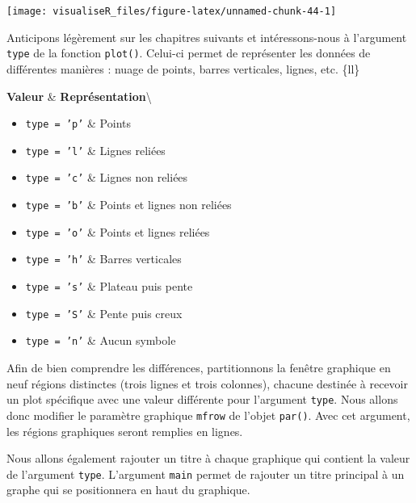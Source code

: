 \documentclass[]{article}
\providecommand{\tightlist}{%
  \setlength{\itemsep}{0pt}\setlength{\parskip}{0pt}}
\begin{document}
\begin{center}\texttt{[image: visualiseR\_files/figure-latex/unnamed-chunk-44-1]} \end{center}

Anticipons légèrement sur les chapitres suivants et intéressons-nous à l'argument \texttt{type} de la fonction \texttt{plot()}. Celui-ci permet de représenter les données de différentes manières : nuage de points, barres verticales, lignes, etc.
\{ll\}

\textbf{Valeur} \& \textbf{Représentation}\textbackslash{}

\begin{itemize}
\tightlist
\item
  \texttt{type = 'p'} \& Points
\item
  \texttt{type = 'l'} \& Lignes reliées
\item
  \texttt{type = 'c'} \& Lignes non reliées
\item
  \texttt{type = 'b'} \& Points et lignes non reliées
\item
  \texttt{type = 'o'} \& Points et lignes reliées
\item
  \texttt{type = 'h'} \& Barres verticales
\item
  \texttt{type = 's'} \& Plateau puis pente
\item
  \texttt{type = 'S'} \& Pente puis creux
\item
  \texttt{type = 'n'} \& Aucun symbole
\end{itemize}

Afin de bien comprendre les différences, partitionnons la fenêtre graphique en neuf régions distinctes (trois lignes et trois colonnes), chacune destinée à recevoir un plot spécifique avec une valeur différente pour l'argument \texttt{type}. Nous allons donc modifier le paramètre graphique \texttt{mfrow} de l'objet \texttt{par()}. Avec cet argument, les régions graphiques seront remplies en lignes.

Nous allons également rajouter un titre à chaque graphique qui contient la valeur de l'argument \texttt{type}. L'argument \texttt{main} permet de rajouter un titre principal à un graphe qui se positionnera en haut du graphique.
\end{document}
